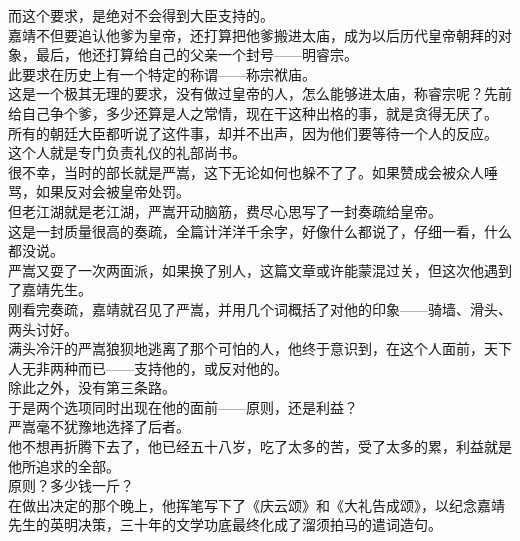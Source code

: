 \begin{multicols}{\theparacolNo}
而这个要求，是绝对不会得到大臣支持的。\\

嘉靖不但要追认他爹为皇帝，还打算把他爹搬进太庙，成为以后历代皇帝朝拜的对象，最后，他还打算给自己的父亲一个封号——明睿宗。\\

此要求在历史上有一个特定的称谓——称宗袱庙。\\

这是一个极其无理的要求，没有做过皇帝的人，怎么能够进太庙，称睿宗呢？先前给自己争个爹，多少还算是人之常情，现在干这种出格的事，就是贪得无厌了。\\

所有的朝廷大臣都听说了这件事，却并不出声，因为他们要等待一个人的反应。\\

这个人就是专门负责礼仪的礼部尚书。\\

很不幸，当时的部长就是严嵩，这下无论如何也躲不了了。如果赞成会被众人唾骂，如果反对会被皇帝处罚。\\

但老江湖就是老江湖，严嵩开动脑筋，费尽心思写了一封奏疏给皇帝。\\

这是一封质量很高的奏疏，全篇计洋洋千余字，好像什么都说了，仔细一看，什么都没说。\\

严嵩又耍了一次两面派，如果换了别人，这篇文章或许能蒙混过关，但这次他遇到了嘉靖先生。\\

刚看完奏疏，嘉靖就召见了严嵩，并用几个词概括了对他的印象——骑墙、滑头、两头讨好。\\

满头冷汗的严嵩狼狈地逃离了那个可怕的人，他终于意识到，在这个人面前，天下人无非两种而已——支持他的，或反对他的。\\

除此之外，没有第三条路。\\

于是两个选项同时出现在他的面前——原则，还是利益？\\

严嵩毫不犹豫地选择了后者。\\

他不想再折腾下去了，他已经五十八岁，吃了太多的苦，受了太多的累，利益就是他所追求的全部。\\

原则？多少钱一斤？\\

在做出决定的那个晚上，他挥笔写下了《庆云颂》和《大礼告成颂》，以纪念嘉靖先生的英明决策，三十年的文学功底最终化成了溜须拍马的遣词造句。\\


\end{multicols}
